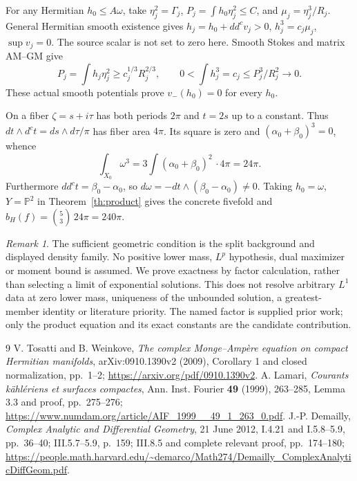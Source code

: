\documentclass[11pt]{article}
\newcommand{\ddc}{dd^c}
\newcommand{\dc}{d^c}
\theoremstyle{remark}\newtheorem{remark}[theorem]{Remark}
\begin{document}
For any Hermitian $h_0\leq A\omega$, take $\eta_j^2=\Gamma_j$,
$P_j=\int h_0\eta_j^2\leq C$, and $\mu_j=\eta_j^3/R_j$.
General Hermitian smooth existence \cite[Corollary 1]{TW} gives
$h_j=h_0+\ddc v_j>0$, $h_j^3=c_j\mu_j$, $\sup v_j=0$.
The source scalar is not set to zero here. Smooth Stokes and matrix
AM--GM give
\[
 P_j=\int h_j\eta_j^2\geq c_j^{1/3}R_j^{2/3},\qquad
 0<\int h_j^3=c_j\leq P_j^3/R_j^2\longrightarrow0.
\]
These actual smooth potentials prove $v_-(h_0)=0$ for every $h_0$.

On a fiber $\zeta=s+i\tau$ has both periods $2\pi$ and $t=2s$ up to
a constant. Thus $dt\wedge\dc t=ds\wedge d\tau/\pi$ has fiber
area $4\pi$. Its square is zero and $(\alpha_0+\beta_0)^3=0$, whence
\[
 \int_{X_0}\omega^3
 =3\int(\alpha_0+\beta_0)^2\,\cdot4\pi=24\pi.
\]
Furthermore $\ddc t=\beta_0-\alpha_0$, so
$d\omega=-dt\wedge(\beta_0-\alpha_0)\ne0$.
Taking $h_0=\omega$, $Y=\mathbb P^2$ in Theorem~\ref{th:product}
gives the concrete fivefold and $b_H(f)=\binom53\,24\pi=240\pi$.

\begin{remark}
The sufficient geometric condition is the split background and displayed
density family. No positive lower mass, $L^p$ hypothesis, dual maximizer
or moment bound is assumed. We prove exactness by factor calculation,
rather than selecting a limit of exponential solutions. This does not
resolve arbitrary $L^1$ data at zero lower mass, uniqueness of the
unbounded solution, a greatest-member identity or literature priority.
The named factor is supplied prior work; only the product equation and
its exact constants are the candidate contribution.
\end{remark}
\begin{thebibliography}{9}
 V. Tosatti and B. Weinkove, \emph{The complex Monge--Amp\`ere
equation on compact Hermitian manifolds}, arXiv:0910.1390v2 (2009),
Corollary 1 and closed normalization, pp.~1--2;
\url{https://arxiv.org/pdf/0910.1390v2}.
 A. Lamari, \emph{Courants k\"ahl\'eriens et surfaces
compactes}, Ann. Inst. Fourier \textbf{49} (1999), 263--285,
Lemma 3.3 and proof, pp.~275--276;
\url{https://www.numdam.org/article/AIF_1999__49_1_263_0.pdf}.
 J.-P. Demailly, \emph{Complex Analytic and Differential
Geometry}, 21 June 2012, I.4.21 and I.5.8--5.9, pp.~36--40;
III.5.7--5.9, p.~159; III.8.5 and complete relevant proof, pp.~174--180;
\url{https://people.math.harvard.edu/~demarco/Math274/Demailly_ComplexAnalyticDiffGeom.pdf}.
\end{thebibliography}
\end{document}
